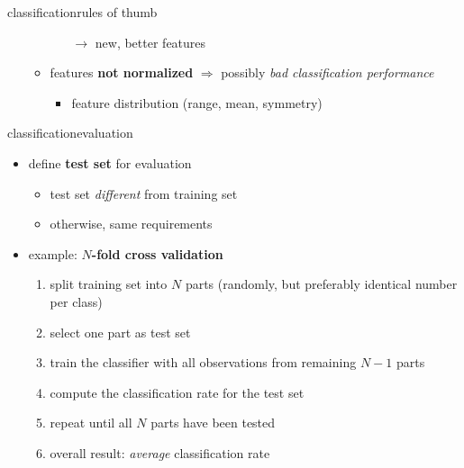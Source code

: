 \begin{frame}{classification}{rules of thumb}
\begin{itemize}
\begin{itemize}
                            \begin{itemize}
                                \item[$\rightarrow$]	new, better features
                            \end{itemize}
                        \item<3->	features \textbf{not normalized} $\Rightarrow$ possibly \textit{bad classification performance}
                            \begin{itemize}
                                \item	feature distribution (range, mean, symmetry)
                            \end{itemize}
                    \end{itemize}
            \end{itemize}
        \end{frame}
        \begin{frame}{classification}{evaluation}
            \begin{itemize}
                \item	define \textbf{test set} for evaluation
                    \begin{itemize}
                        \item	test set \textit{different} from training set
                        \item	otherwise, same requirements
                    \end{itemize}
                
                \bigskip
                \item<2->	example: \textbf{$N$-fold cross validation}
                    \begin{enumerate}
                        \item<2->	split training set into $N$ parts (randomly, but preferably identical number per class)
                        \item<3->	select one part as test set
                        \item<4->	train the classifier with all observations from remaining $N-1$ parts
                        \item<5->	compute the classification rate for the test set
                        \item<6->	repeat until all $N$ parts have been tested
                        \item<7->	overall result: \textit{average} classification rate
                    \end{enumerate}
            \end{itemize}
        \end{frame}
        
